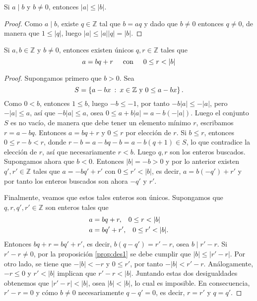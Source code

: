 \begin{proposition}
\label{prop:des1}Si $a\mid b$ y $b \neq 0$, entonces $|a|\leq|b|$.
\end{proposition}
\begin{proof}
Como $a \mid b$, existe $q\in \mathbb{Z}$ tal que $b=aq$ y dado que $b \neq 0$ entonces $q \neq 0$, de manera que $1\leq |q|$, luego $|a|\leq |a||q|=|b|$.
\end{proof}

\begin{theorem}
Si $a,b\in \mathbb{Z}$ y $b \neq 0$, entonces existen únicos $q,r\in \mathbb{Z}$ tales que 
\begin{equation*}
	a=bq+r\hspace*{0.5cm}\textnormal{con}\hspace*{0.5cm} 0\leq r<|b|
\end{equation*}
\end{theorem}
\begin{proof}
Supongamos primero que $b>0$. Sea 
\begin{equation*}
	S=\left\{a-bx \: : \: x\in \mathbb{Z}\textnormal{ y }0\leq a-bx\right\}.
\end{equation*}
Como $0<b$, entonces $1\leq b$, luego $-b\leq -1$, por tanto $-b|a|\leq -|a|$, pero $-|a|\leq a$, así que $-b|a|\leq a$, osea $0\leq a+b|a|=a-b(-|a|)$. Luego el conjunto $S$ es no vacío, de manera que debe tener un elemento mínimo $r$, escribamos $r=a-bq$. Entonces $a=bq+r$ y $0\leq r$ por elección de $r$. Si $b\leq r$, entonces $0\leq r-b<r$, donde $r-b=a-bq-b=a-b(q+1)\in S$, lo que contradice la elección de $r$, así que necesariamente $r<b$. Luego $q,r$ son los enteros buscados. Supongamos ahora que $b<0$. Entonces $|b|=-b>0$ y por lo anterior existen $q',r'\in \mathbb{Z}$ tales que $a=-bq'+r'$ con $0\leq r'<|b|$, es decir, $a=b(-q')+r'$ y por tanto los enteros buscados son ahora $-q'$ y $r'$. 
\bigskip

Finalmente, veamos que estos tales enteros son únicos. Supongamos que $q,r,q',r'\in\mathbb{Z}$ son enteros tales que 
\begin{align*}
	a &=bq+r,\hspace*{0.3cm}0\leq r<|b| \\
	a &=bq'+r',\hspace*{0.3cm}0\leq r'<|b|.
\end{align*}
Entonces $bq+r=bq'+r'$, es decir, $b(q-q')=r'-r$, osea $b \mid r'-r$. Si $r'-r \neq 0$, por la proposición \eqref{prop:des1} se debe cumplir que $|b|\leq |r'-r|$. Por otro lado, se tiene que $-|b|<-r$ y $0\leq r'$, por tanto $-|b|<r'-r$. Análogamente, $-r\leq 0$ y $r'<|b|$ implican que $r'-r<|b|$. Juntando estas dos desigualdades obtenemos que $|r'-r|<|b|$, osea $|b|<|b|$, lo cual es imposible. En consecuencia, $r'-r=0$ y cómo $b \neq 0$ necesariamente $q-q'=0$, es decir, $r=r'$ y $q=q'$.
\end{proof}

